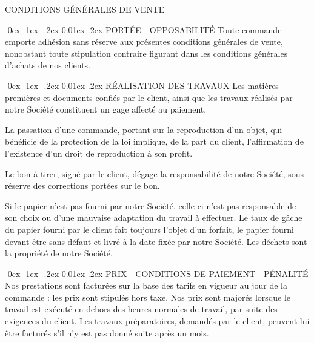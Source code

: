 \documentclass[a4paper, oneside, 10pt, french]{article}
\makeatletter
\renewcommand{\section}{\@startsection {section}{1}{\z@}%
             {-0ex \@plus -1ex \@minus -.2ex}%
             {0.01ex \@plus.2ex}%
             {\normalfont\normalsize\sffamily}}
\makeatother
\begin{document}
\begin{center}
\textcolor{chaumeil-violet}{\textsc{\Large CONDITIONS GÉNÉRALES DE VENTE}}
\end{center}
\begin{multicols}{2}

\begin{small}
\section{PORTÉE - OPPOSABILITÉ}
Toute commande emporte adhésion sans réserve aux présentes conditions générales de vente,
nonobstant toute stipulation contraire figurant dans les conditions générales d'achats de nos
clients.

\section{RÉALISATION DES TRAVAUX}
Les matières premières et documents confiés par le client, ainsi que les
travaux réalisés par notre Société constituent un gage affecté au paiement.

La passation d'une commande, portant sur la reproduction d'un objet, qui bénéficie de la
protection de la loi implique, de la part du client, l'affirmation de l'existence d'un droit de
reproduction à son profit.

Le bon à tirer, signé par le client, dégage la responsabilité de notre Société, sous réserve des
corrections portées sur le bon.

Si le papier n'est pas fourni par notre Société, celle-ci n'est pas responsable de son choix ou
d'une mauvaise adaptation du travail à effectuer. Le taux de gâche du papier fourni par le
client fait toujours l'objet d'un forfait, le papier fourni devant être sans défaut et livré à la date
fixée par notre Société. Les déchets sont la propriété de notre Société.

\section{PRIX - CONDITIONS DE PAIEMENT - PÉNALITÉ}
Nos prestations sont facturées sur la base des tarifs en vigueur au jour de la commande : les
prix sont stipulés hors taxe. Nos prix sont majorés lorsque le travail est exécuté en dehors des
heures normales de travail, par suite des exigences du client. Les travaux préparatoires,
demandés par le client, peuvent lui être facturés s'il n'y est pas donné suite après un mois.


\end{small}
\end{multicols}
\end{document}
